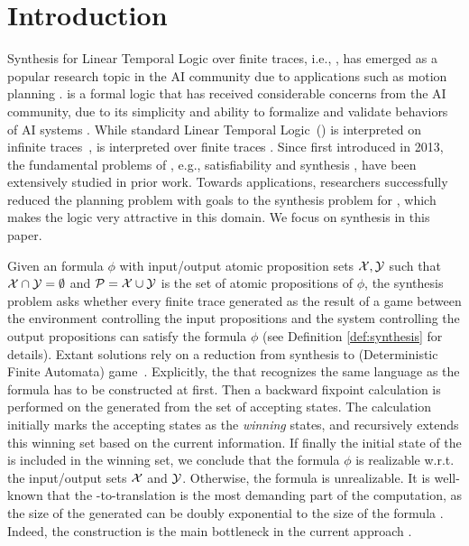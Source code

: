 \section{Introduction}\label{sec:intro}
Synthesis for Linear Temporal Logic over finite traces, i.e., \ltlf\citep{GV13}, has emerged as a popular research topic in the AI community due to applications such as motion planning \citep{ZGPV20,R04}.  
\ltlf is a formal logic that has received considerable concerns from the AI community, due to its simplicity and ability to formalize and validate behaviors of AI systems \cite{GV13,GV15}. %
While standard Linear Temporal Logic~(\ltl) is interpreted on infinite traces~\citep{Pnu77}, \ltlf is interpreted over finite traces \citep{GV13}. Since first introduced in 2013, the fundamental problems of \ltlf, e.g., satisfiability \citep{LZPVH14,LRPZV19} and synthesis \citep{GV15,ZTLPV17}, have been extensively studied in prior work. Towards applications, researchers successfully reduced the planning problem with \ltlf goals to the synthesis problem for \ltlf \citep{CTMBM17,CBM18,AGMR18,AGMR19,ZGPV20}, which makes the logic very attractive in this domain. We focus on \ltlf synthesis in this paper.   

Given an \ltlf formula $\phi$ with input/output atomic proposition sets $\mathcal{X},\mathcal{Y}$ such that $\mathcal{X}\cap \mathcal{Y}=\emptyset$ and $\mathcal{P}=\mathcal{X}\cup\mathcal{Y}$ is the set of atomic propositions of $\phi$, the synthesis problem asks whether every finite trace generated as the result of a game between the environment controlling the input propositions and the system controlling the output propositions can satisfy the formula $\phi$ (see Definition \ref{def:synthesis} for details). Extant solutions rely on a reduction from \ltlf synthesis to \dfa (Deterministic Finite Automata) game~\citep{GV15}. Explicitly, the \dfa that recognizes the same language as the \ltlf formula has to be constructed at first. Then a backward fixpoint calculation is performed on the generated \dfa from the set of accepting states. The calculation initially marks the accepting states as the \emph{winning} states, and recursively extends this winning set based on the current information. If finally the initial state of the \dfa is included in the winning set, we conclude that the formula $\phi$ is realizable w.r.t. the input/output sets $\mathcal{X}$ and $\mathcal{Y}$. Otherwise, the formula is unrealizable. It is well-known that the \ltlf-to-\dfa translation is the most demanding part of the computation, as the size of the generated \dfa can be doubly exponential to the size of the formula \citep{KV01d}. Indeed, the \dfa construction is the main bottleneck in the current approach \cite{ZTLPV17}.

